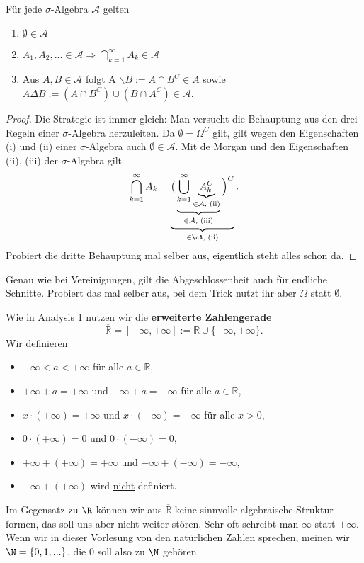 \begin{lemma}\label{gd}
Für jede $\sigma\text{-Algebra}$ $\mathcal{A}$ gelten
\begin{enumerate}[label=(\roman*)]
	\item $\emptyset \in \mathcal{A}$
	\item $A_{1}, A_{2},... \in \mathcal{A} \Rightarrow \bigcap\limits_{k=1}^{\infty} A_{k} \in \mathcal{A}$
	\item Aus $A, B \in \mathcal{A}$ folgt A $\backslash B := A \cap B^C \in A$ sowie $A \Delta B := (A\cap B^C) \cup (B \cap A^C) \in  \mathcal A$.
\end{enumerate}
\begin{proof}
	Die Strategie ist immer gleich: Man versucht die Behauptung aus den drei Regeln einer $\sigma$-Algebra herzuleiten. Da $\emptyset =\Omega^C$ gilt, gilt wegen den Eigenschaften (i) und (ii) einer $\sigma$-Algebra auch $\emptyset \in \mathcal A$. Mit de Morgan und den Eigenschaften (ii), (iii) der $\sigma$-Algebra gilt
	\begin{align*}
		\bigcap_{k=1}^\infty A_k =\underbrace{\big(\underbrace{\bigcup_{k=1}^\infty \underbrace{A_k^C}_{\in \mathcal A,\text{ (ii)}}}_{\in \mathcal A,\text{ (iii)}}\Big)^C}_{\in \cA,\text{ (ii)}}.
	\end{align*}
	Probiert die dritte Behauptung mal selber aus, eigentlich steht alles schon da.
\end{proof}
\end{lemma}
Genau wie bei Vereinigungen, gilt die Abgeschlossenheit auch f\"ur endliche Schnitte. Probiert das mal selber aus, bei dem Trick nutzt ihr aber $\Omega$ statt $\emptyset$.



\begin{bem1}
Wie in Analysis 1 nutzen wir die \textbf{erweiterte Zahlengerade} $$\overline{\mathbb{R}} = [-\infty, +\infty] := \mathbb{R} \cup \{ -\infty, +\infty \}.$$ Wir definieren
\begin{itemize}
	\item $-\infty < a < +\infty$ f\"ur alle $a\in \mathbb R$,
		\item $+\infty + a = +\infty$ und $-\infty + a = -\infty$ f\"ur alle $ a \in \mathbb{R}$,
	\item $x \cdot (+\infty)=+\infty$ und $x \cdot (-\infty)=-\infty$ f\"ur alle $x>0$,
	\item $0\cdot (+\infty)=0$ und $0\cdot (-\infty)=0$,
	\item $+\infty+(+\infty)=+\infty$ und $-\infty+(-\infty)=-\infty$,
	\item $-\infty+(+\infty)$ wird \underline{nicht} definiert.
\end{itemize}	
	 Im Gegensatz zu $\R$ k\"onnen wir aus $\overline{\mathbb{R}}$ keine sinnvolle algebraische Struktur formen, das soll uns aber nicht weiter st\"oren. Sehr oft schreibt man $\infty$ statt $+\infty$. Wenn wir in dieser Vorlesung von den nat\"urlichen Zahlen sprechen, meinen wir $\N=\{0,1,...\}$, die $0$ soll also zu $\N$ geh\"oren.
\end{bem1}


